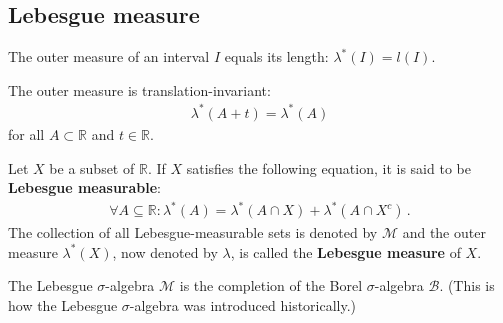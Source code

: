 \subsection{Lebesgue measure}


    \begin{property}[Intervals]
        The outer measure of an interval $I$ equals its length: $\lambda^*(I)=l(I)$.
    \end{property}
    \begin{property}\label{measure:translation_invariant}
        The outer measure is translation-invariant:
        \begin{gather}
            \lambda^*(A+t) = \lambda^*(A)
        \end{gather}
        for all $A\subset\mathbb{R}$ and $t\in\mathbb{R}$.
    \end{property}

    \begin{theorem}\label{measure:lebesgue_measure}
        Let $X$ be a subset of $\mathbb{R}$. If $X$ satisfies the following equation, it is said to be \textbf{Lebesgue measurable}:
        \begin{gather}
            \forall A\subseteq\mathbb{R}:\lambda^*(A) = \lambda^*(A\cap X) + \lambda^*(A\cap X^c)\,.
        \end{gather}
        The collection of all Lebesgue-measurable sets is denoted by $\mathcal{M}$ and the outer measure $\lambda^*(X)$, now denoted by $\lambda$, is called the \textbf{Lebesgue measure} of $X$.
    \end{theorem}
    \begin{result}\label{measure:completion_remark}
        The Lebesgue $\sigma$-algebra $\mathcal{M}$ is the completion of the Borel $\sigma$-algebra $\mathcal{B}$. (This is how the Lebesgue $\sigma$-algebra was introduced historically.)
    \end{result}

